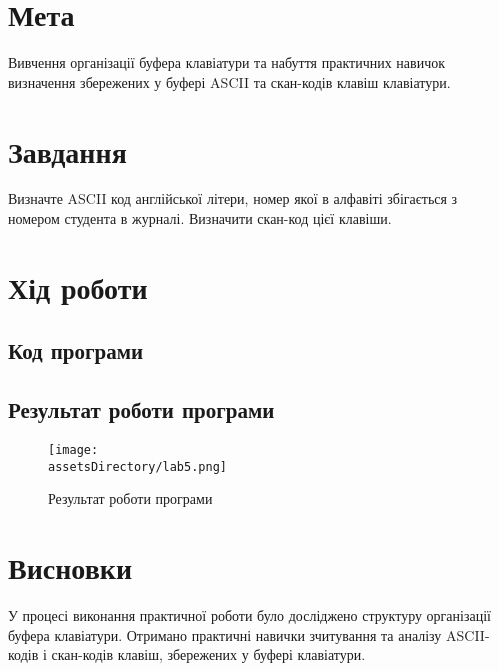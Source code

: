 \section{Мета}
Вивчення організації буфера клавіатури та набуття практичних навичок визначення збережених у буфері ASCII та скан-кодів клавіш клавіатури.


\section{Завдання}
Визначте ASCII код англійської літери, номер якої в алфавіті збігається з номером студента в журналі.
Визначити скан-код цієї клавіши.


\section{Хід роботи}
\subsection{Код програми}


\subsection{Результат роботи програми}
\begin{figure}[ht!]
    \centering
    \texttt{[image: \\assetsDirectory/lab5.png]}
    \caption{Результат роботи програми}
\end{figure}

\clearpage
\section{Висновки}
У процесі виконання практичної роботи було досліджено структуру організації буфера клавіатури. Отримано практичні навички зчитування та аналізу ASCII-кодів і скан-кодів клавіш, збережених у буфері клавіатури.
